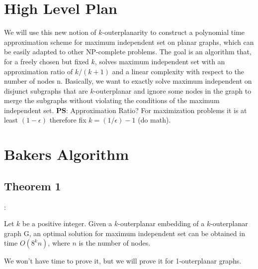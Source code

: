 \documentclass{beamer}
\begin{document}
\section{High Level Plan}
\begin{frame}{\secname}
    We will use this new notion of $k$-outerplanarity to construct a polynomial time approximation scheme for maximum independent set on planar graphs, which can be
easily adapted to other NP-complete problems. The goal
is an algorithm that, for a freely chosen but fixed $k$, solves maximum independent set with an approximation ratio
of $k / (k + 1)$ and a linear complexity with respect to the
number of nodes n.
Basically, we want to exactly solve maximum independent on disjunct subgraphs that are $k$-outerplanar and
ignore some nodes in the graph to merge the subgraphs
without violating the conditions of the maximum independent set.
\newline
\newline
\newline
\textbf{PS}: Approximation Ratio? For maximization problems it is at least $(1 - \epsilon)$ therefore fix $k = (1/\epsilon) - 1$ (do math).
\end{frame}
\section{Bakers Algorithm}
\subsection{Theorem 1}
\begin{frame}{\secname : \subsecname}
   \begin{theorem} 
    [Baker, 1994] Let $k$ be a positive integer. Given a $k$-outerplanar embedding of a $k$-outerplanar
    graph G, an optimal solution for maximum independent
    set can be obtained in time $O(8^kn)$, where $n$ is the number of nodes.
    \end{theorem}

    We won't have time to prove it, but we will prove it for 1-outerplanar graphs.
\end{frame}
\end{document}
